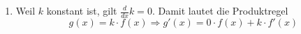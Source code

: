 \begin{enumerate}
\begin{enumerate}
                    \textbf{Wichtig:} Die folgende verführerische Umformung ist falsch $\frac{x^2+3x-1}{x+1} \neq \frac{x^2+3x-1}{x} + \frac{x^2+3x-1}{1}$  \end{enumerate}



    \item Weil $k$ konstant ist, gilt $\frac{d}{dx}k = 0$. Damit lautet die Produktregel
          $$ g(x) = k \cdot f(x) \Rightarrow g'(x) = 0 \cdot f(x) + k \cdot f'(x) $$


\end{enumerate}
\clearpage